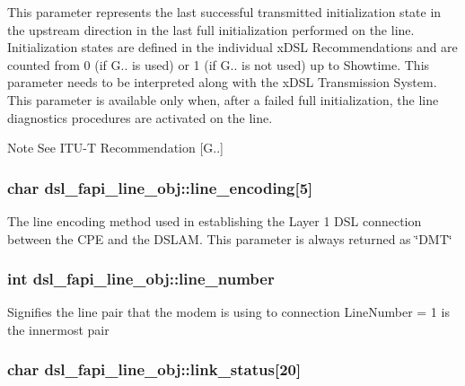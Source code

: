 This parameter represents the last successful transmitted initialization state in the upstream direction in the last full initialization performed on the line. Initialization states are defined in the individual x\-D\-S\-L Recommendations and are counted from 0 (if G.. is used) or 1 (if G.. is not used) up to Showtime. This parameter needs to be interpreted along with the x\-D\-S\-L Transmission System. This parameter is available only when, after a failed full initialization, the line diagnostics procedures are activated on the line. \begin{DoxyNote}{Note}
See I\-T\-U-\/\-T Recommendation \mbox{[}G..\mbox{]} 
\end{DoxyNote}
\hypertarget{structdsl__fapi__line__obj_a7149428e5bd71db580fb32510c8636a1}{
\subsubsection[{line\-\_\-encoding}]{\setlength{\rightskip}{0pt plus 5cm}char dsl\-\_\-fapi\-\_\-line\-\_\-obj\-::line\-\_\-encoding\mbox{[}5\mbox{]}}}\label{structdsl__fapi__line__obj_a7149428e5bd71db580fb32510c8636a1}
The line encoding method used in establishing the Layer 1 D\-S\-L connection between the C\-P\-E and the D\-S\-L\-A\-M. This parameter is always returned as \char`\"{}\-D\-M\-T\char`\"{} \hypertarget{structdsl__fapi__line__obj_adc1ce69a9211c94934ec7762608d8db7}{
\subsubsection[{line\-\_\-number}]{\setlength{\rightskip}{0pt plus 5cm}int dsl\-\_\-fapi\-\_\-line\-\_\-obj\-::line\-\_\-number}}\label{structdsl__fapi__line__obj_adc1ce69a9211c94934ec7762608d8db7}
Signifies the line pair that the modem is using to connection Line\-Number = 1 is the innermost pair \hypertarget{structdsl__fapi__line__obj_a0aafbe991c821849398cef04fe2c01aa}{
\subsubsection[{link\-\_\-status}]{\setlength{\rightskip}{0pt plus 5cm}char dsl\-\_\-fapi\-\_\-line\-\_\-obj\-::link\-\_\-status\mbox{[}20\mbox{]}}}\label{structdsl__fapi__line__obj_a0aafbe991c821849398cef04fe2c01aa}
